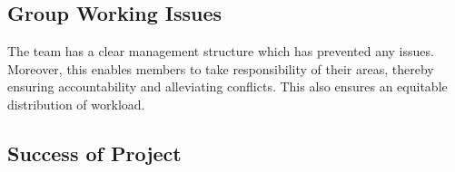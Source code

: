 \subsection{Group Working Issues}

The team has a clear management structure which has prevented any issues. Moreover, this enables members to take responsibility of their areas, thereby ensuring accountability and alleviating conflicts. This also ensures an equitable distribution of workload.

\subsection{Success of Project}

